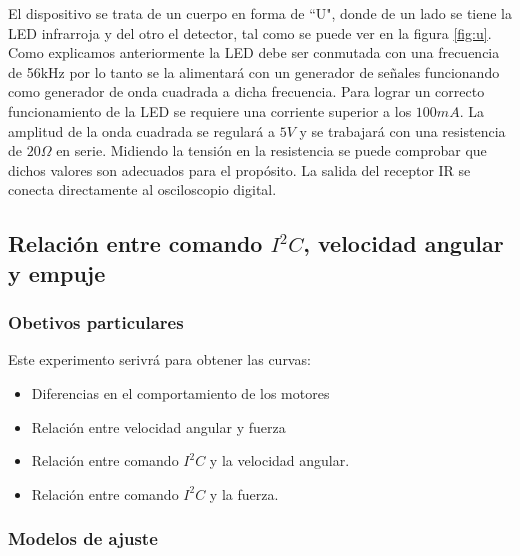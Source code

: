 \documentclass[main]{subfiles}
\begin{document}
El dispositivo se trata de un cuerpo en forma de ``U", donde de un lado se tiene la LED infrarroja y del otro el detector, tal como se puede ver en la figura \ref{fig:u}.\\

Como explicamos anteriormente la LED debe ser conmutada con una frecuencia de 56kHz por lo tanto se la alimentar\'a con un generador de se\~nales funcionando como generador de onda cuadrada a dicha frecuencia. Para lograr un correcto funcionamiento de la LED se requiere una corriente superior a los $100mA$. La amplitud de la onda cuadrada se regular\'a a $5V$ y se trabajar\'a con una resistencia de $20\Omega$ en serie. Midiendo la tensi\'on en la resistencia se puede comprobar que dichos valores son adecuados para el prop\'osito. La salida del receptor IR se conecta directamente al osciloscopio digital.\\

\subsection{Relaci\'on entre comando $I^2C$, velocidad angular y empuje}

\subsubsection*{Obetivos particulares}
Este experimento serivr\'a para obtener las curvas:
\begin{itemize}
\item Diferencias en el comportamiento de los motores
\item Relaci\'on entre velocidad angular y fuerza
\item Relaci\'on entre comando $I^2C$ y la velocidad angular.
\item Relaci\'on entre comando $I^2C$ y la fuerza.
\end{itemize}

\subsubsection*{Modelos de ajuste}
\end{document}
